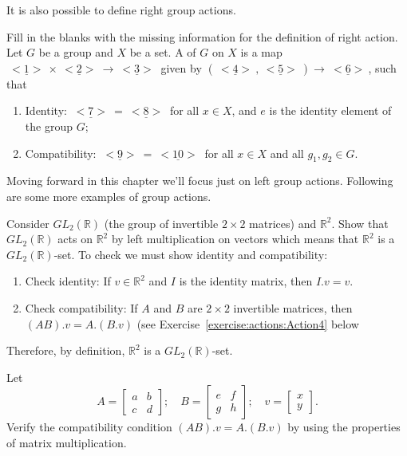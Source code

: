 It is also possible to define right group actions.

\begin{exercise}\label{exercise:actions:RightAction}
Fill in the blanks with the missing information for the definition of right action. Let $G$ be a group and $X$ be a set. A  of $G$ on $X$ is a map $\underline{~<1>~}\times \underline{~<2>~}\rightarrow \underline{~<3>~}$ given by $(\underline{~<4>~}, \underline{~<5>~})\rightarrow \underline{~<6>~}$, such that
\begin{enumerate}[(1)]
\item Identity: $\underline{~<7>~}=\underline{~<8>~}$ for all $x\in X$, and $e$ is the identity element of the group $G$;
\item Compatibility: $\underline{~<9>~}=\underline{~<10>~}$ for all $x\in X$ and all $g_1, g_2 \in G$.
\end{enumerate}
\end{exercise}

Moving forward in this chapter we'll focus just on left group actions.  Following are some more examples of group actions.

\begin{example}\label{example:actions:Action3}
Consider $GL_2(\mathbb{R})$ (the group of invertible $2 \times 2$ matrices) and $\mathbb{R}^2$. Show that $GL_2(\mathbb{R})$ acts on $\mathbb{R}^2$ by left multiplication on vectors which means that $\mathbb{R}^2$ is a $GL_2(\mathbb{R})$-set. To check we must show identity and compatibility:
\begin{enumerate}[(1)]
\item Check identity: If $v\in \mathbb{R}^2$ and $I$ is the identity matrix, then $I.v = v$. 
\item Check compatibility: If $A$ and $B$ are $2 \times 2$ invertible matrices, then $(AB).v = A.(B.v)$ (see Exercise~\ref{exercise:actions:Action4} below\end{enumerate}
Therefore, by definition, $\mathbb{R}^2$ is a $GL_2(\mathbb{R})$-set.
\end{example}

\begin{exercise}\label{exercise:actions:Action4}
Let
\begin{equation*}
A=\left[\begin{array}{cc}
a&b\\c&d\end{array}\right]; \quad 
B=\left[\begin{array}{cc} e& f\\ g & h\end{array}\right]; \quad 
v=\left[\begin{array}{c}x\\ y\end{array}\right].
\end{equation*}
Verify the compatibility condition $(AB).v = A.(B.v)$  by using the properties  of matrix  multiplication. 
\end{exercise}

